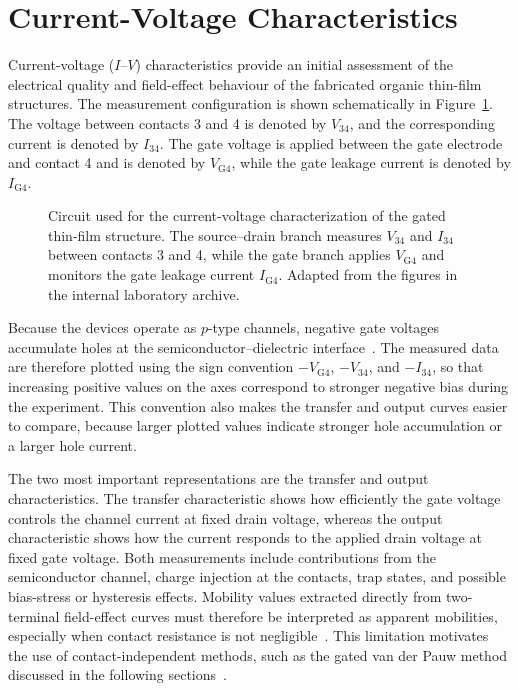 \section{Current-Voltage Characteristics}

Current-voltage ($I$--$V$) characteristics provide an initial assessment of the electrical quality and field-effect behaviour of the fabricated organic thin-film structures. The measurement configuration is shown schematically in Figure~\ref{fig:ofet_iv_circuit}. The voltage between contacts 3 and 4 is denoted by $V_{34}$, and the corresponding current is denoted by $I_{34}$. The gate voltage is applied between the gate electrode and contact 4 and is denoted by $V_\text{G4}$, while the gate leakage current is denoted by $I_\text{G4}$.

\begin{figure}[htbp]
\centering
\resizebox{0.65\textwidth}{!}{}
\caption[Circuit used for current-voltage characterization]{Circuit used for the current-voltage characterization of the gated thin-film structure. The source--drain branch measures $V_{34}$ and $I_{34}$ between contacts 3 and 4, while the gate branch applies $V_\text{G4}$ and monitors the gate leakage current $I_\text{G4}$. Adapted from the figures in the internal laboratory archive.}
\label{fig:ofet_iv_circuit}
\end{figure}

Because the devices operate as $p$-type channels, negative gate voltages accumulate holes at the semiconductor--dielectric interface~\cite{Sirringhaus2005DevicePhysics,Neamen}. The measured data are therefore plotted using the sign convention $-V_\text{G4}$, $-V_{34}$, and $-I_{34}$, so that increasing positive values on the axes correspond to stronger negative bias during the experiment. This convention also makes the transfer and output curves easier to compare, because larger plotted values indicate stronger hole accumulation or a larger hole current.

The two most important representations are the transfer and output characteristics. The transfer characteristic shows how efficiently the gate voltage controls the channel current at fixed drain voltage, whereas the output characteristic shows how the current responds to the applied drain voltage at fixed gate voltage. Both measurements include contributions from the semiconductor channel, charge injection at the contacts, trap states, and possible bias-stress or hysteresis effects. Mobility values extracted directly from two-terminal field-effect curves must therefore be interpreted as apparent mobilities, especially when contact resistance is not negligible~\cite{Natali2012ChargeInjection,Bittle2016MobilityOverestimation}. This limitation motivates the use of contact-independent methods, such as the gated van der Pauw method discussed in the following sections~\cite{Rolin2017GVDP}.

